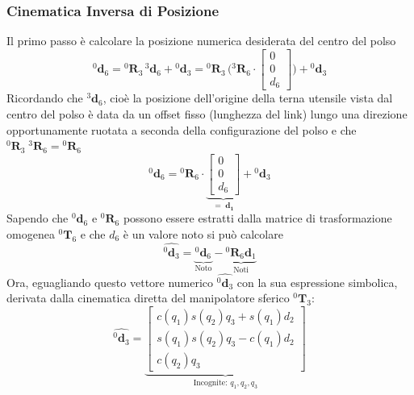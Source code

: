 ﻿\documentclass[11pt, a4paper]{article}
\begin{document}
\subsubsection*{Cinematica Inversa di Posizione}
Il primo passo è calcolare la posizione numerica desiderata del centro del polso
\[
    {}^{0}\mathbf{d}_{6} = {}^0\mathbf{R}_3 \, {}^{3}\mathbf{d}_{6} + {}^{0}\mathbf{d}_{3} = {}^0\mathbf{R}_3 \, \biggl({}^3\mathbf{R}_6 \cdot \begin{bmatrix} 0\\ 0\\ d_{6} \end{bmatrix}\biggr) + {}^{0}\mathbf{d}_{3}
\]
Ricordando che \({}^{3}\mathbf{d}_{6}\), cioè la posizione dell'origine della terna utensile vista dal centro del polso è data da un offset fisso (lunghezza del link) lungo una direzione opportunamente ruotata a seconda della configurazione del polso e che \({}^0\mathbf{R}_3 \; {}^3\mathbf{R}_6 = {}^0\mathbf{R}_6\)
\[
    {}^{0}\mathbf{d}_{6} = {}^0\mathbf{R}_6 \cdot \underbrace{\begin{bmatrix} 0\\ 0\\ d_{6} \end{bmatrix}}_{= \;\mathbf{d_{1}}} + {}^{0}\mathbf{d}_{3}
\]
Sapendo che \({}^{0}\mathbf{d}_{6}\) e \({}^{0}\mathbf{R}_{6}\) possono essere estratti dalla matrice di trasformazione omogenea \({}^{0}\mathbf{T}_{6}\) e che \(d_{6}\) è un valore noto si può calcolare
\[
    \boxed{
        \hat{{}^{0}\mathbf{d}_{3}} = \underbrace{{}^{0}\mathbf{d}_{6}}_{\text{Noto}} - \underbrace{{}^{0}\mathbf{R}_{6}\mathbf{d}_1}_{\text{Noti}}
    }
\]
Ora, eguagliando questo vettore numerico \(\hat{{}^{0}\mathbf{d}_{3}}\) con la sua espressione simbolica, derivata dalla cinematica diretta del manipolatore sferico \({}^{0}\mathbf{T}_{3}\):
\[
    \hat{^{0}\mathbf{d}_{3}} =
    \underbrace{
    \begin{bmatrix}
        c(q_{1})s(q_{2})q_{3} + s(q_{1})d_{2}\\
        s(q_{1})s(q_{2})q_{3} - c(q_{1})d_{2}\\
        c(q_{2})q_{3}
    \end{bmatrix}
    }_{\text{Incognite: } q_1, q_2, q_3}
\]
\end{document}
